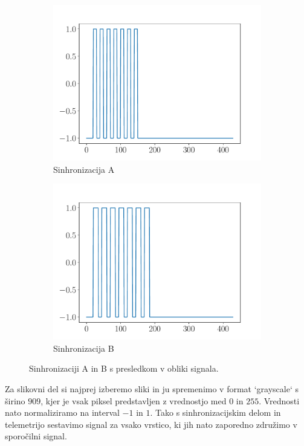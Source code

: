 \documentclass{article}
\begin{document}
\begin{figure}[H]
    \centering
    \begin{subfigure}[b]{0.45\textwidth}
        \centering
        \includegraphics[width=\textwidth]{sync_frame0.pdf}
        \caption{Sinhronizacija A}
    \end{subfigure}
    \hfill
    \begin{subfigure}[b]{0.45\textwidth}
        \centering
        \includegraphics[width=\textwidth]{sync_frame1.pdf}
        \caption{Sinhronizacija B}
    \end{subfigure}

    \caption{Sinhronizaciji A in B s presledkom v obliki signala.}
    \label{fig:sync_frames}
\end{figure}
Za slikovni del si najprej izberemo sliki in ju spremenimo v format `grayscale` s širino $909$, kjer je vsak piksel predstavljen z vrednostjo med $0$ in $255$. Vrednosti nato normaliziramo na interval $-1$ in $1$. Tako s sinhronizacijskim delom in telemetrijo sestavimo signal za vsako vrstico, ki jih nato zaporedno združimo v sporočilni signal.
\end{document}
